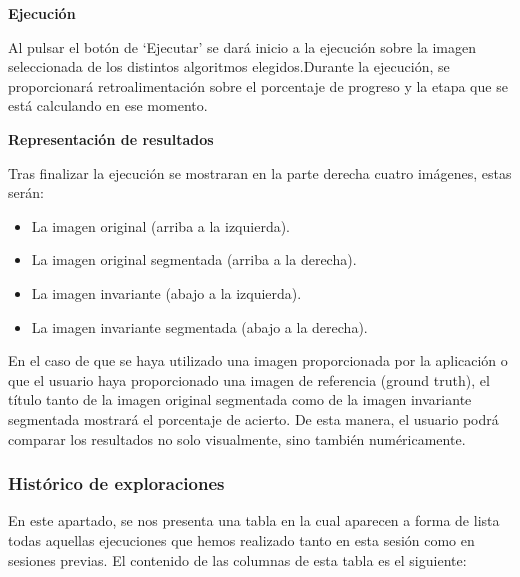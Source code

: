\textbf{Ejecución}\label{ejecución}

Al pulsar el botón de `Ejecutar' se dará inicio a la ejecución sobre la imagen seleccionada de los distintos algoritmos elegidos.Durante la ejecución, se proporcionará retroalimentación sobre el porcentaje de progreso y la etapa que se está calculando en ese momento.

\textbf{Representación de resultados}\label{representación-de-resultados}

Tras finalizar la ejecución se mostraran en la parte derecha cuatro imágenes, estas serán:

\begin{itemize}
    \item La imagen original (arriba a la izquierda).
    \item La imagen original segmentada (arriba a la derecha).
    \item La imagen invariante (abajo a la izquierda).
    \item La imagen invariante segmentada (abajo a la derecha).
\end{itemize}

En el caso de que se haya utilizado una imagen proporcionada por la aplicación o que el usuario haya proporcionado una imagen de referencia (ground truth), el título tanto de la imagen original segmentada como de la imagen invariante segmentada mostrará el porcentaje de acierto. De esta manera, el usuario podrá comparar los resultados no solo visualmente, sino también numéricamente.

\subsubsection{Histórico de exploraciones}\label{Histórico-de-exploraciones}

En este apartado, se nos presenta una tabla en la cual aparecen a forma de lista todas aquellas ejecuciones que hemos realizado tanto en esta sesión como en sesiones previas. El contenido de las columnas de esta tabla es el siguiente:


